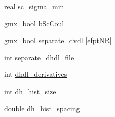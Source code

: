 \begin{DoxyCompactItemize}
$$\item 
real \hyperlink{structt__lambda_ac713b56189833d65b66874d23a88384c}{sc\-\_\-sigma\-\_\-min}
\item 
\hyperlink{include_2types_2simple_8h_a8fddad319f226e856400d190198d5151}{gmx\-\_\-bool} \hyperlink{structt__lambda_aa7bd22f7a028a8d4598b591753451651}{b\-Sc\-Coul}
\item 
\hyperlink{include_2types_2simple_8h_a8fddad319f226e856400d190198d5151}{gmx\-\_\-bool} \hyperlink{structt__lambda_abd91ceacca7006aded7bdef3184f3ddf}{separate\-\_\-dvdl} \mbox{[}\hyperlink{share_2template_2gromacs_2types_2enums_8h_a16db4876b192da08f3ad0cb41afe516fa608028db6ca73c710d635ec2490129e0}{efpt\-N\-R}\mbox{]}
\item 
int \hyperlink{structt__lambda_a084ba7d66d950b4d0de8609646d17096}{separate\-\_\-dhdl\-\_\-file}
\item 
int \hyperlink{structt__lambda_ad609e5abd04719fb023942cdc4d8946a}{dhdl\-\_\-derivatives}
\item 
int \hyperlink{structt__lambda_acdbcd453fdb7af3fa9af6850f9254a1b}{dh\-\_\-hist\-\_\-size}
\item 
double \hyperlink{structt__lambda_a21f6da1526fcfc8d98b91c61e08cdf7e}{dh\-\_\-hist\-\_\-spacing}
\end{DoxyCompactItemize}


